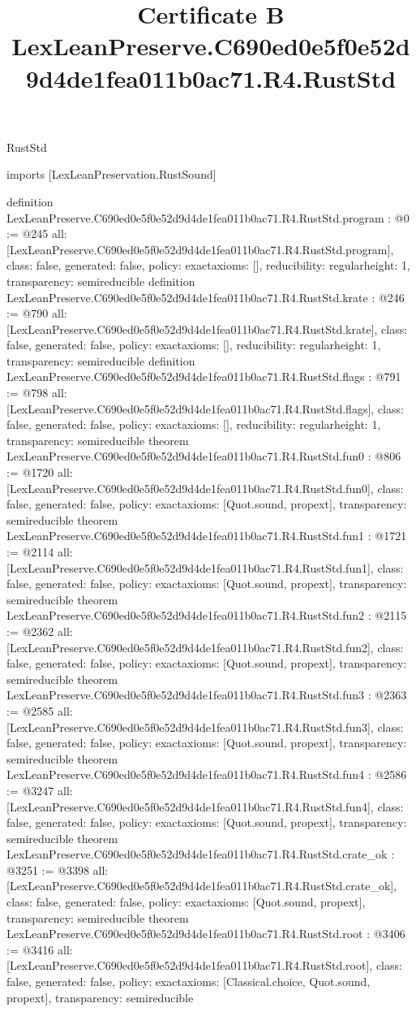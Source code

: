 \begin{lexlean}{RustStd}
\title{Certificate B LexLeanPreserve.C690ed0e5f0e52d9d4de1fea011b0ac71.R4.RustStd}
\begin{coremodule}
imports [LexLeanPreservation.RustSound]

definition LexLeanPreserve.C690ed0e5f0e52d9d4de1fea011b0ac71.R4.RustStd.program : @0 := @245 {
  all: [LexLeanPreserve.C690ed0e5f0e52d9d4de1fea011b0ac71.R4.RustStd.program],
  class: false,
  generated: false,
  policy: exact{axioms: []},
  reducibility: regular{height: 1},
  transparency: semireducible
}
definition LexLeanPreserve.C690ed0e5f0e52d9d4de1fea011b0ac71.R4.RustStd.krate : @246 := @790 {
  all: [LexLeanPreserve.C690ed0e5f0e52d9d4de1fea011b0ac71.R4.RustStd.krate],
  class: false,
  generated: false,
  policy: exact{axioms: []},
  reducibility: regular{height: 1},
  transparency: semireducible
}
definition LexLeanPreserve.C690ed0e5f0e52d9d4de1fea011b0ac71.R4.RustStd.flags : @791 := @798 {
  all: [LexLeanPreserve.C690ed0e5f0e52d9d4de1fea011b0ac71.R4.RustStd.flags],
  class: false,
  generated: false,
  policy: exact{axioms: []},
  reducibility: regular{height: 1},
  transparency: semireducible
}
theorem LexLeanPreserve.C690ed0e5f0e52d9d4de1fea011b0ac71.R4.RustStd.fun0 : @806 := @1720 {
  all: [LexLeanPreserve.C690ed0e5f0e52d9d4de1fea011b0ac71.R4.RustStd.fun0],
  class: false,
  generated: false,
  policy: exact{axioms: [Quot.sound, propext]},
  transparency: semireducible
}
theorem LexLeanPreserve.C690ed0e5f0e52d9d4de1fea011b0ac71.R4.RustStd.fun1 : @1721 := @2114 {
  all: [LexLeanPreserve.C690ed0e5f0e52d9d4de1fea011b0ac71.R4.RustStd.fun1],
  class: false,
  generated: false,
  policy: exact{axioms: [Quot.sound, propext]},
  transparency: semireducible
}
theorem LexLeanPreserve.C690ed0e5f0e52d9d4de1fea011b0ac71.R4.RustStd.fun2 : @2115 := @2362 {
  all: [LexLeanPreserve.C690ed0e5f0e52d9d4de1fea011b0ac71.R4.RustStd.fun2],
  class: false,
  generated: false,
  policy: exact{axioms: [Quot.sound, propext]},
  transparency: semireducible
}
theorem LexLeanPreserve.C690ed0e5f0e52d9d4de1fea011b0ac71.R4.RustStd.fun3 : @2363 := @2585 {
  all: [LexLeanPreserve.C690ed0e5f0e52d9d4de1fea011b0ac71.R4.RustStd.fun3],
  class: false,
  generated: false,
  policy: exact{axioms: [Quot.sound, propext]},
  transparency: semireducible
}
theorem LexLeanPreserve.C690ed0e5f0e52d9d4de1fea011b0ac71.R4.RustStd.fun4 : @2586 := @3247 {
  all: [LexLeanPreserve.C690ed0e5f0e52d9d4de1fea011b0ac71.R4.RustStd.fun4],
  class: false,
  generated: false,
  policy: exact{axioms: [Quot.sound, propext]},
  transparency: semireducible
}
theorem LexLeanPreserve.C690ed0e5f0e52d9d4de1fea011b0ac71.R4.RustStd.crate_ok : @3251 := @3398 {
  all: [LexLeanPreserve.C690ed0e5f0e52d9d4de1fea011b0ac71.R4.RustStd.crate_ok],
  class: false,
  generated: false,
  policy: exact{axioms: [Quot.sound, propext]},
  transparency: semireducible
}
theorem LexLeanPreserve.C690ed0e5f0e52d9d4de1fea011b0ac71.R4.RustStd.root : @3406 := @3416 {
  all: [LexLeanPreserve.C690ed0e5f0e52d9d4de1fea011b0ac71.R4.RustStd.root],
  class: false,
  generated: false,
  policy: exact{axioms: [Classical.choice, Quot.sound, propext]},
  transparency: semireducible
}


\end{coremodule}
\end{lexlean}
